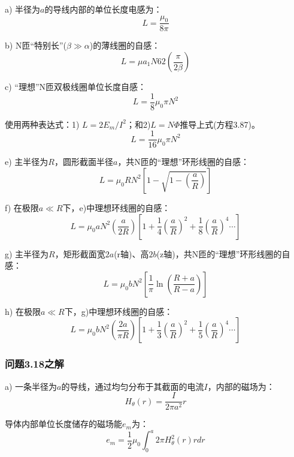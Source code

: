 a) 半径为$a$的导线内部的单位长度电感为：
 \begin{equation}%
L=\frac{\mu_0}{8\pi}
\end{equation}

b) N匝“特别长”($\beta\gg \alpha$)的薄线圈的自感：
 \begin{equation}%
L=\mu a_1N62\left(\frac{\pi}{2\beta}\right)
\end{equation}

c) “理想”N匝双极线圈单位长度自感：
 \begin{equation}%
L=\frac{1}{8}\mu_0\pi N^2
\end{equation}

使用两种表达式：1) $L= 2E_m/I^2$；和2)$ L=N\Phi$推导上式(方程3.87)。
\begin{equation}%
L=\frac{1}{16}\mu_0\pi N^2
\end{equation}

e) 主半径为$R$，圆形截面半径$a$，共N匝的“理想”环形线圈的自感：
 \begin{equation}%
L=\mu_0 R N^2\left[1-\sqrt{1-\left(\frac{a}{R}\right)}\right]
\end{equation}

f) 在极限$a\ll R$下，e)中理想环线圈的自感：
 \begin{equation}%
L=\mu_0aN^2(\frac{a}{2R})[1+\frac{1}{4}(\frac{a}{R})^2+\frac{1}{8}(\frac{a}{R})^4\cdots]
\end{equation}

g) 主半径为$R$，矩形截面宽$2a$(r轴)、高$2b$(z轴)，共N匝的“理想”环形线圈的自感：
 \begin{equation}%
L=\mu_0 b N^2\left[\frac{1}{\pi}\ln\left(\frac{R+a}{R-a}\right)\right]
\end{equation}

h) 在极限$a\ll R$下，g)中理想环线圈的自感：
 \begin{equation}%
L=\mu_0bN^2(\frac{2a}{\pi R})[1+\frac{1}{3}(\frac{a}{R})^2+\frac{1}{5}(\frac{a}{R})^4\cdots]
\end{equation}

\subsubsection{问题3.18之解}
a) 一条半径为$a$的导线，通过均匀分布于其截面的电流$I$，内部的磁场为：
 \begin{equation}%
H_\theta(r)=\frac{I}{2\pi a^2}r
\end{equation}

导体内部单位长度储存的磁场能$e_m$为：
 \begin{equation}%
e_m=\frac{1}{2}\mu_0\int_{0}^{a}2\pi H_{\theta}^{2}(r)rdr
\end{equation}

